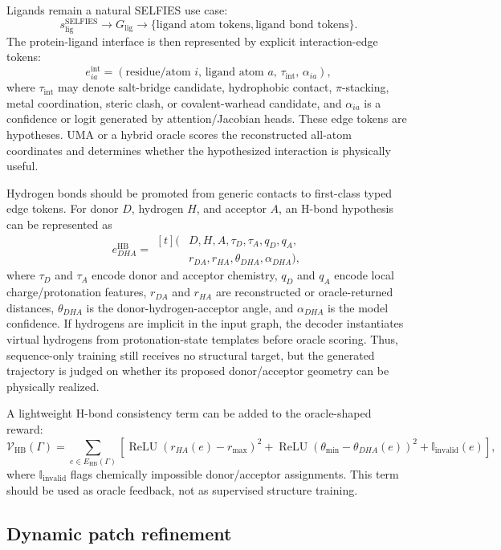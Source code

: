 \documentclass[11pt]{article}
\begin{document}
Ligands remain a natural SELFIES use case:
\[
s_{\mathrm{lig}}^{\mathrm{SELFIES}}
\to
G_{\mathrm{lig}}
\to
\{\text{ligand atom tokens},\text{ligand bond tokens}\}.
\]
The protein-ligand interface is then represented by explicit interaction-edge tokens:
\[
e_{ia}^{\mathrm{int}}
=
\left(
\text{residue/atom } i,\,
\text{ligand atom } a,\,
\tau_{\mathrm{int}},\,
\alpha_{ia}
\right),
\]
where $\tau_{\mathrm{int}}$ may denote salt-bridge candidate, hydrophobic contact, $\pi$-stacking, metal coordination, steric clash, or covalent-warhead candidate, and $\alpha_{ia}$ is a confidence or logit generated by attention/Jacobian heads. These edge tokens are hypotheses. UMA or a hybrid oracle scores the reconstructed all-atom coordinates and determines whether the hypothesized interaction is physically useful.

Hydrogen bonds should be promoted from generic contacts to first-class typed edge tokens. For donor $D$, hydrogen $H$, and acceptor $A$, an H-bond hypothesis can be represented as
\[
e_{DHA}^{\mathrm{HB}}
=
\begin{aligned}[t]
(&D,H,A,\tau_D,\tau_A,q_D,q_A,\\
&r_{DA},r_{HA},\theta_{DHA},\alpha_{DHA}),
\end{aligned}
\]
where $\tau_D$ and $\tau_A$ encode donor and acceptor chemistry, $q_D$ and $q_A$ encode local charge/protonation features, $r_{DA}$ and $r_{HA}$ are reconstructed or oracle-returned distances, $\theta_{DHA}$ is the donor-hydrogen-acceptor angle, and $\alpha_{DHA}$ is the model confidence. If hydrogens are implicit in the input graph, the decoder instantiates virtual hydrogens from protonation-state templates before oracle scoring. Thus, sequence-only training still receives no structural target, but the generated trajectory is judged on whether its proposed donor/acceptor geometry can be physically realized.

A lightweight H-bond consistency term can be added to the oracle-shaped reward:
\[
\mathcal{V}_{\mathrm{HB}}(\Gamma)
=
\sum_{e\in E_{\mathrm{HB}}(\Gamma)}
\left[
\operatorname{ReLU}(r_{HA}(e)-r_{\max})^2
+
\operatorname{ReLU}(\theta_{\min}-\theta_{DHA}(e))^2
+
\mathbb{I}_{\mathrm{invalid}}(e)
\right],
\]
where $\mathbb{I}_{\mathrm{invalid}}$ flags chemically impossible donor/acceptor assignments. This term should be used as oracle feedback, not as supervised structure training.

\subsection{Dynamic patch refinement}
\end{document}
